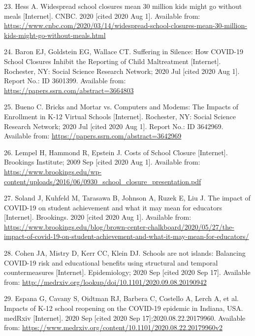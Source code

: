 \documentclass[
]{article}
\begin{document}
\leavevmode\hypertarget{ref-hess_widespread_2020}{}%
23. Hess A. Widespread school closures mean 30 million kids might go
without meals {[}Internet{]}. CNBC. 2020 {[}cited 2020 Aug 1{]}.
Available from:
\url{https://www.cnbc.com/2020/03/14/widespread-school-closures-mean-30-million-kids-might-go-without-meals.html}

\leavevmode\hypertarget{ref-baron_suffering_2020}{}%
24. Baron EJ, Goldstein EG, Wallace CT. Suffering in Silence: How
COVID-19 School Closures Inhibit the Reporting of Child Maltreatment
{[}Internet{]}. Rochester, NY: Social Science Research Network; 2020 Jul
{[}cited 2020 Aug 1{]}. Report No.: ID 3601399. Available from:
\url{https://papers.ssrn.com/abstract=3664803}

\leavevmode\hypertarget{ref-bueno_bricks_2020}{}%
25. Bueno C. Bricks and Mortar vs. Computers and Modems: The Impacts of
Enrollment in K-12 Virtual Schools {[}Internet{]}. Rochester, NY: Social
Science Research Network; 2020 Jul {[}cited 2020 Aug 1{]}. Report No.:
ID 3642969. Available from:
\url{https://papers.ssrn.com/abstract=3642969}

\leavevmode\hypertarget{ref-lempel_costs_2009}{}%
26. Lempel H, Hammond R, Epstein J. Costs of School Closure
{[}Internet{]}. Brookings Institute; 2009 Sep {[}cited 2020 Aug 1{]}.
Available from:
\url{https://www.brookings.edu/wp-content/uploads/2016/06/0930_school_closure_presentation.pdf}

\leavevmode\hypertarget{ref-soland_impact_2020}{}%
27. Soland J, Kuhfeld M, Tarasawa B, Johnson A, Ruzek E, Liu J. The
impact of COVID-19 on student achievement and what it may mean for
educators {[}Internet{]}. Brookings. 2020 {[}cited 2020 Aug 1{]}.
Available from:
\url{https://www.brookings.edu/blog/brown-center-chalkboard/2020/05/27/the-impact-of-covid-19-on-student-achievement-and-what-it-may-mean-for-educators/}

\leavevmode\hypertarget{ref-cohen_schools_2020}{}%
28. Cohen JA, Mistry D, Kerr CC, Klein DJ. Schools are not islands:
Balancing COVID-19 risk and educational benefits using structural and
temporal countermeasures {[}Internet{]}. Epidemiology; 2020 Sep {[}cited
2020 Sep 17{]}. Available from:
\url{http://medrxiv.org/lookup/doi/10.1101/2020.09.08.20190942}

\leavevmode\hypertarget{ref-espana_impacts_2020}{}%
29. Espana G, Cavany S, Oidtman RJ, Barbera C, Costello A, Lerch A, et
al. Impacts of K-12 school reopening on the COVID-19 epidemic in
Indiana, USA. medRxiv {[}Internet{]}. 2020 Sep {[}cited 2020 Sep
17{]};2020.08.22.20179960. Available from:
\url{https://www.medrxiv.org/content/10.1101/2020.08.22.20179960v2}
\end{document}
